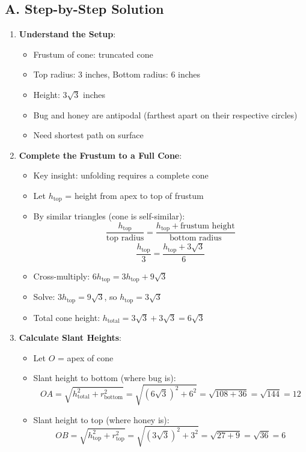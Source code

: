 \documentclass[12pt]{article}
\begin{document}
\begin{solutionbox}
\subsection*{A. Step-by-Step Solution}
\begin{enumerate}[leftmargin=*]
    \item \textbf{Understand the Setup}: 
    \begin{itemize}
        \item Frustum of cone: truncated cone
        \item Top radius: 3 inches, Bottom radius: 6 inches
        \item Height: $3\sqrt{3}$ inches
        \item Bug and honey are antipodal (farthest apart on their respective circles)
        \item Need shortest path on surface
    \end{itemize}
    
    \item \textbf{Complete the Frustum to a Full Cone}: 
    \begin{itemize}
        \item Key insight: unfolding requires a complete cone
        \item Let $h_{\text{top}}$ = height from apex to top of frustum
        \item By similar triangles (cone is self-similar):
        \[\frac{h_{\text{top}}}{\text{top radius}} = \frac{h_{\text{top}} + \text{frustum height}}{\text{bottom radius}}\]
        \[\frac{h_{\text{top}}}{3} = \frac{h_{\text{top}} + 3\sqrt{3}}{6}\]
        \item Cross-multiply: $6h_{\text{top}} = 3h_{\text{top}} + 9\sqrt{3}$
        \item Solve: $3h_{\text{top}} = 9\sqrt{3}$, so $h_{\text{top}} = 3\sqrt{3}$
        \item Total cone height: $h_{\text{total}} = 3\sqrt{3} + 3\sqrt{3} = 6\sqrt{3}$
    \end{itemize}
    
    \item \textbf{Calculate Slant Heights}: 
    \begin{itemize}
        \item Let $O$ = apex of cone
        \item Slant height to bottom (where bug is): 
        \[OA = \sqrt{h_{\text{total}}^2 + r_{\text{bottom}}^2} = \sqrt{(6\sqrt{3})^2 + 6^2} = \sqrt{108 + 36} = \sqrt{144} = 12\]
        \item Slant height to top (where honey is):
        \[OB = \sqrt{h_{\text{top}}^2 + r_{\text{top}}^2} = \sqrt{(3\sqrt{3})^2 + 3^2} = \sqrt{27 + 9} = \sqrt{36} = 6\]
    \end{itemize}
    

\end{enumerate}
\end{solutionbox}
\end{document}
